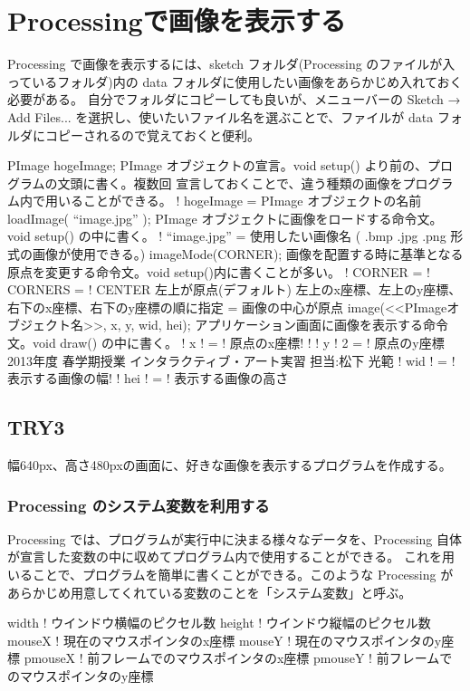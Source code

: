\documentclass[11pt,a4paper]{jarticle}
\begin{document}
\section{Processingで画像を表示する}
Processing で画像を表示するには、sketch フォルダ(Processing のファイルが入っているフォルダ)内の data フォルダに使用したい画像をあらかじめ入れておく必要がある。
自分でフォルダにコピーしても良いが、メニューバーの Sketch → Add Files... を選択し、使いたいファイル名を選ぶことで、ファイルが data フォルダにコピーされるので覚えておくと便利。

PImage hogeImage;
 PImage オブジェクトの宣言。void setup() より前の、プログラムの文頭に書く。複数回
宣言しておくことで、違う種類の画像をプログラム内で用いることができる。
!
hogeImage = PImage オブジェクトの名前
loadImage( “image.jpg” );
 PImage オブジェクトに画像をロードする命令文。void setup() の中に書く。
!
“image.jpg” = 使用したい画像名 ( .bmp .jpg .png 形式の画像が使用できる。)
imageMode(CORNER);
 画像を配置する時に基準となる原点を変更する命令文。void setup()内に書くことが多い。
! CORNER
=
! CORNERS =
! CENTER
左上が原点(デフォルト)
左上のx座標、左上のy座標、右下のx座標、右下のy座標の順に指定
=
画像の中心が原点
image(<<PImageオブジェクト名>>, x, y, wid, hei);
 アプリケーション画面に画像を表示する命令文。void draw() の中に書く。
!
x !
= !
原点のx座標! !
!
y !
2
= !
原点のy座標
2013年度 春学期授業       インタラクティブ・アート実習         担当:松下 光範
!
wid ! = !
表示する画像の幅!
!
hei ! = !
表示する画像の高さ


\subsection*{TRY3}
幅640px、高さ480pxの画面に、好きな画像を表示するプログラムを作成する。

\subsubsection*{Processing のシステム変数を利用する}
Processing では、プログラムが実行中に決まる様々なデータを、Processing 自体が宣言した変数の中に収めてプログラム内で使用することができる。
これを用いることで、プログラムを簡単に書くことができる。このような Processing があらかじめ用意してくれている変数のことを「システム変数」と呼ぶ。

width
!
ウインドウ横幅のピクセル数
height
!
ウインドウ縦幅のピクセル数
mouseX
!
現在のマウスポインタのx座標
mouseY
!
現在のマウスポインタのy座標
pmouseX
!
前フレームでのマウスポインタのx座標
pmouseY
!
前フレームでのマウスポインタのy座標
\end{document}
